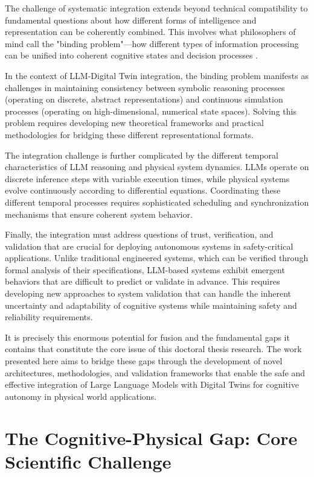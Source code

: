 The challenge of systematic integration extends beyond technical compatibility to fundamental questions about how different forms of intelligence and representation can be coherently combined. This involves what philosophers of mind call the "binding problem"—how different types of information processing can be unified into coherent cognitive states and decision processes \cite{treisman1996binding, shadlen2003neural}.

In the context of LLM-Digital Twin integration, the binding problem manifests as challenges in maintaining consistency between symbolic reasoning processes (operating on discrete, abstract representations) and continuous simulation processes (operating on high-dimensional, numerical state spaces). Solving this problem requires developing new theoretical frameworks and practical methodologies for bridging these different representational formats.

The integration challenge is further complicated by the different temporal characteristics of LLM reasoning and physical system dynamics. LLMs operate on discrete inference steps with variable execution times, while physical systems evolve continuously according to differential equations. Coordinating these different temporal processes requires sophisticated scheduling and synchronization mechanisms that ensure coherent system behavior.

Finally, the integration must address questions of trust, verification, and validation that are crucial for deploying autonomous systems in safety-critical applications. Unlike traditional engineered systems, which can be verified through formal analysis of their specifications, LLM-based systems exhibit emergent behaviors that are difficult to predict or validate in advance. This requires developing new approaches to system validation that can handle the inherent uncertainty and adaptability of cognitive systems while maintaining safety and reliability requirements.

It is precisely this enormous potential for fusion and the fundamental gaps it contains that constitute the core issue of this doctoral thesis research. The work presented here aims to bridge these gaps through the development of novel architectures, methodologies, and validation frameworks that enable the safe and effective integration of Large Language Models with Digital Twins for cognitive autonomy in physical world applications.

\section{The Cognitive-Physical Gap: Core Scientific Challenge}

